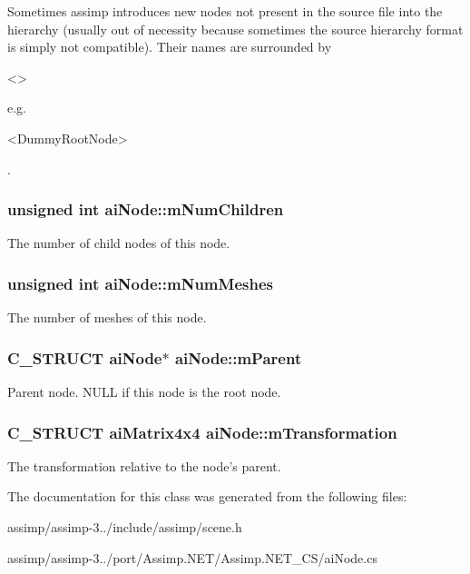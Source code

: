 Sometimes assimp introduces new nodes not present in the source file into the hierarchy (usually out of necessity because sometimes the source hierarchy format is simply not compatible). Their names are surrounded by\begin{DoxyVerb}<> \end{DoxyVerb}
 e.\+g. \begin{DoxyVerb}<DummyRootNode> \end{DoxyVerb}
. \hypertarget{structai_node_af5030494b156ec54632e6182a6e386ca}{
\subsubsection[{m\+Num\+Children}]{\setlength{\rightskip}{0pt plus 5cm}unsigned int ai\+Node\+::m\+Num\+Children}}\label{structai_node_af5030494b156ec54632e6182a6e386ca}
The number of child nodes of this node. \hypertarget{structai_node_a7a411079096f86d1e96b6368d237d897}{
\subsubsection[{m\+Num\+Meshes}]{\setlength{\rightskip}{0pt plus 5cm}unsigned int ai\+Node\+::m\+Num\+Meshes}}\label{structai_node_a7a411079096f86d1e96b6368d237d897}
The number of meshes of this node. \hypertarget{structai_node_aa6896b42c78e784db85d822a4c8dd404}{
\subsubsection[{m\+Parent}]{\setlength{\rightskip}{0pt plus 5cm}C\+\_\+\+S\+T\+R\+U\+C\+T {\bf ai\+Node}$\ast$ ai\+Node\+::m\+Parent}}\label{structai_node_aa6896b42c78e784db85d822a4c8dd404}
Parent node. N\+U\+L\+L if this node is the root node. \hypertarget{structai_node_aadb69c766c7658bba9d2195af16d6831}{
\subsubsection[{m\+Transformation}]{\setlength{\rightskip}{0pt plus 5cm}C\+\_\+\+S\+T\+R\+U\+C\+T {\bf ai\+Matrix4x4} ai\+Node\+::m\+Transformation}}\label{structai_node_aadb69c766c7658bba9d2195af16d6831}
The transformation relative to the node's parent. 

The documentation for this class was generated from the following files\+:\begin{DoxyCompactItemize}
\item 
assimp/assimp-\/3../include/assimp/scene.\+h\item 
assimp/assimp-\/3../port/\+Assimp.\+N\+E\+T/\+Assimp.\+N\+E\+T\+\_\+\+C\+S/ai\+Node.\+cs\end{DoxyCompactItemize}
